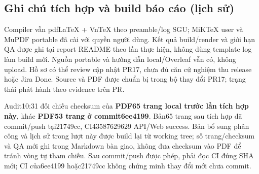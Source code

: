 \subsection{Ghi chú tích hợp và build báo cáo (lịch sử)}
Compiler vẫn pdfLaTeX + VnTeX theo preamble/log SGU; MiKTeX user và MuPDF portable
đã cài với quyền người dùng. Kết quả build/render và giới hạn QA được ghi tại
report README theo lần thực hiện, không dùng template log làm build mới.
Nguồn portable và hướng dẫn local/Overleaf vẫn có, không upload.
Hồ sơ có thể review cập nhật PR17,
chưa đủ căn cứ nghiệm thu release hoặc Jira Done. Source và PDF được chuẩn bị
trong bộ thay đổi PR17; trạng thái phát hành theo evidence trên PR.


Audit10:31 đối chiếu checksum của \textbf{PDF65 trang local trước lần tích hợp
này}, khác \textbf{PDF53 trang ở commit6ee4199}. Bản65 trang sau tích hợp đã commit/push tại21749cc, CI43587629629 API/Web success.
Bản bổ sung phân công và lịch sử trong lượt này được build lại
từ working tree; số trang/checksum và QA mới ghi trong Markdown bàn giao,
không đưa checksum vào PDF để tránh vòng tự tham chiếu. Sau commit/push được
phép, phải đọc CI đúng SHA mới; CI của6ee4199 hoặc21749cc không chứng minh thay đổi mới chưa commit.
